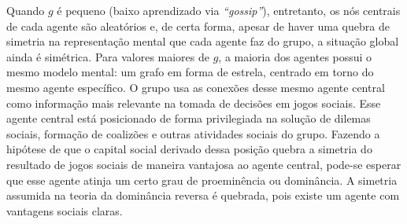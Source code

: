 Quando $g$ é pequeno (baixo aprendizado via \emph{``gossip''}), entretanto,  os nós centrais de cada agente são aleatórios e, de certa forma, apesar de haver uma quebra de simetria na representação mental que cada agente faz do grupo, a situação global ainda é simétrica. Para valores maiores de $g$, a maioria dos agentes possui o mesmo modelo mental: um grafo em forma de estrela, centrado em torno do mesmo agente específico. O grupo usa as conexões desse mesmo agente central como informação mais relevante na tomada de decisões em jogos sociais. Esse agente central está posicionado de forma privilegiada na solução de dilemas sociais, formação de coalizões e outras atividades sociais do grupo. Fazendo a hipótese de que o capital social derivado dessa posição quebra a simetria do resultado de jogos sociais de maneira vantajosa ao agente central, pode-se esperar que esse agente atinja um certo grau de proeminência ou dominância. A simetria assumida na teoria da dominância reversa é quebrada, pois existe um agente com vantagens sociais claras.

